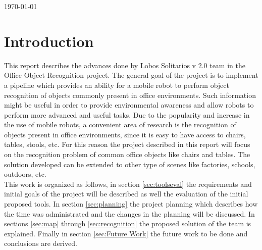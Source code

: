\documentclass[fontsize=12pt]{article}
\begin{document}
\begin{titlepage}


{\large \today}\\[3cm] %


 

\vfill %

\end{titlepage}
\tableofcontents
\pagebreak[4]
\section{Introduction}\label{sec:intro}
This report describes the advances done by Lobos Solitarios v 2.0 team in the Office Object Recognition project. The general goal of the project is to implement a pipeline which provides an ability for a mobile robot to perform object recognition of objects commonly present in office environments. Such information might be useful in order to provide environmental awareness and allow robots to perform more advanced and useful tasks. Due to the popularity and increase in the use of mobile robots, a convenient area of research is the recognition of objects present in office environments, since it is easy to have access to chairs, tables, stools, etc. For this reason the project described in this report will focus on the recognition problem of common office objects like chairs and tables. The solution developed can be extended to other type of scenes like factories, schools, outdoors, etc.  \\ \linebreak
This work is organized as follows, in section \ref{sec:toolseval} the requirements and initial goals of the project will be described as well the evaluation of the initial proposed tools. In section \ref{sec:planning}  the project planning which describes how the time was administrated and the changes in the planning will be discussed. In sections \ref{sec:map} through \ref{sec:recognition} the proposed solution of the team is explained. Finally in section \ref{sec:Future Work} the future work to be done and conclusions are  derived. 
\end{document}

